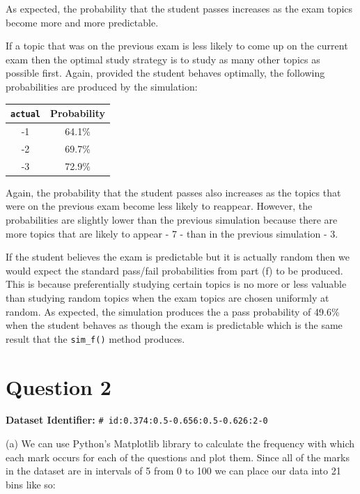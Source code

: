 \documentclass[10pt]{article}
\begin{document}
As expected, the probability that the student passes increases as the exam topics become more and more predictable.

If a topic that was on the previous exam is less likely to come up on the current exam then the optimal study strategy is to study as many other topics as possible first. Again, provided the student behaves optimally, the following probabilities are produced by the simulation:

\begin{center}
    \begin{tabular}{|c|c|}
        \hline
        \texttt{actual} & Probability \\ \hline
        -1 & 64.1\% \\ \hline
        -2 & 69.7\% \\ \hline
        -3 & 72.9\% \\ \hline
    \end{tabular}
\end{center}

Again, the probability that the student passes also increases as the topics that were on the previous exam become less likely to reappear. However, the probabilities are slightly lower than the previous simulation because there are more topics that are likely to appear - 7 - than in the previous simulation - 3.

If the student believes the exam is predictable but it is actually random then we would expect the standard pass/fail probabilities from part (f) to be produced. This is because preferentially studying certain topics is no more or less valuable than studying random topics when the exam topics are chosen uniformly at random. As expected, the simulation produces the a pass probability of 49.6\% when the student behaves as though the exam is predictable which is the same result that the \texttt{sim\_f()} method produces.

\section*{Question 2}

\noindent \textbf{Dataset Identifier:} \texttt{\# id:0.374:0.5-0.656:0.5-0.626:2-0}

\noindent (a) We can use Python's Matplotlib library to calculate the frequency with which each mark occurs for each of the questions and plot them. Since all of the marks in the dataset are in intervals of 5 from 0 to 100 we can place our data into 21 bins like so:
\end{document}
